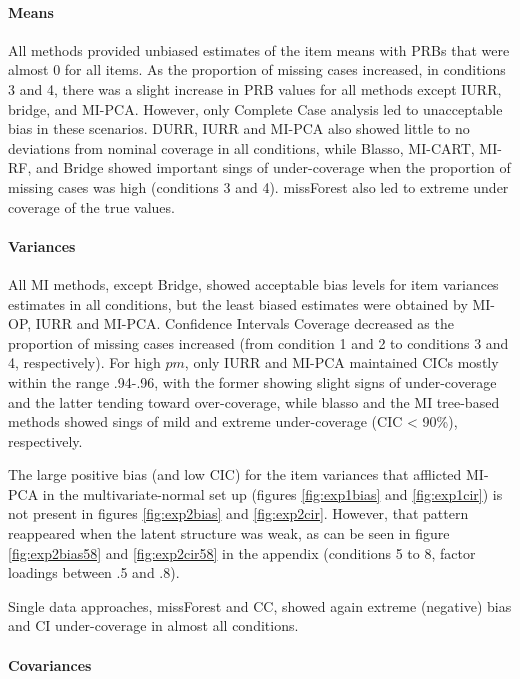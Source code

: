 	\paragraph{Means}
	All methods provided unbiased estimates of the item means with PRBs that were almost 0 for all items.
	As the proportion of missing cases increased, in conditions 3 and 4, there was a slight increase in 
	PRB values for all methods except IURR, bridge, and MI-PCA. 
	However, only Complete Case analysis led to unacceptable bias in these scenarios.
	DURR, IURR and MI-PCA also showed little to no deviations from nominal coverage in all conditions, 
	while Blasso, MI-CART, MI-RF, and Bridge showed important sings of under-coverage when the proportion of 
	missing cases was high (conditions 3 and 4). 
	missForest also led to extreme under coverage of the true values.
	
	\paragraph{Variances}
	All MI methods, except Bridge, showed acceptable bias levels for item variances estimates in all conditions, 
	but the least biased estimates were obtained by MI-OP, IURR and MI-PCA.
	Confidence Intervals Coverage decreased as the proportion of missing cases increased (from condition 1 and 2 
	to conditions 3 and 4, respectively).
	For high $pm$, only IURR and MI-PCA maintained CICs mostly within the range .94-.96, with the former showing slight signs of 
	under-coverage and the latter tending toward over-coverage, while blasso and the MI tree-based methods showed sings of 
	mild and extreme under-coverage (CIC < 90\%), respectively.

	The large positive bias (and low CIC) for the item variances that afflicted MI-PCA in the multivariate-normal set up 
	(figures \ref{fig:exp1bias} and \ref{fig:exp1cir}) is not present in figures \ref{fig:exp2bias} and \ref{fig:exp2cir}.
	However, that pattern reappeared when the latent structure was weak, as can be seen in figure \ref{fig:exp2bias58} 
	and \ref{fig:exp2cir58} in the appendix (conditions 5 to 8, factor loadings between .5 and .8).

	Single data approaches, missForest and CC, showed again extreme (negative) bias and CI under-coverage in 
	almost all conditions.

	\paragraph{Covariances}

